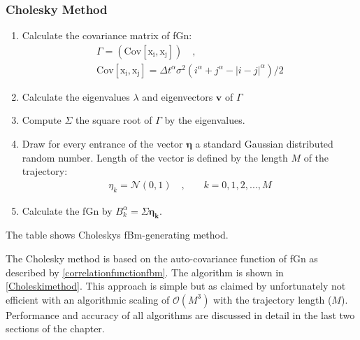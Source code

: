 \documentclass[
  a4paper,BCOR10mm,twoside,
  headsepline,footsepline,%
  fleqn,openbib
]{scrbook}
\begin{document}
\subsubsection{Cholesky Method}
\begin{table}
\begin{framed}
\begin{enumerate}
 \item Calculate the covariance matrix of fGn:
 \begin{align}
  \Gamma=(\mathrm{Cov[x_i,x_j]}) \quad , \\  \mathrm{Cov[x_i,x_j]}=\Delta t^\alpha \sigma^2(i^{\alpha}+j^{\alpha}-|i-j|^\alpha)/2
 \end{align}
\item Calculate the eigenvalues $\lambda$ and eigenvectors $\bm{v}$ of $\Gamma$ 
\item Compute $\Sigma$ the square root of $\Gamma$ by the eigenvalues.
\item Draw for every entrance of the vector $\bm{\eta}$  a standard Gaussian distributed random number. Length of the vector is defined by the length $M$ of the trajectory:
\begin{align}
 \eta_k= \mathcal{N}(0,1) \quad \text{,}  \qquad k=0,1,2,...,M 
\end{align}
\item Calculate the fGn by $B^{\alpha}_k =\Sigma \bm{\eta_k}$.
\end{enumerate}
\end{framed}
\caption{The table shows Choleskys fBm-generating method.}
\label{Choleskimethod}
\end{table}
The Cholesky method \cite{Dieker2004} is based on the auto-covariance function of fGn as described by \cref{correlationfunctionfbm}. The algorithm is shown in \cref{Choleskimethod}. This approach is simple but as claimed by \citet{Dieker2004} unfortunately not efficient with an algorithmic scaling of $\mathcal{O}(M^3)$ with the trajectory length ($M$). Performance and accuracy of all algorithms are discussed in detail in the last two sections of the chapter.
\end{document}
